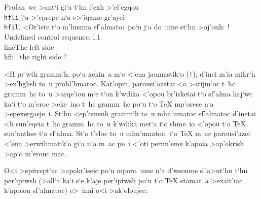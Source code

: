 Profan~wc >ant`i gi`a t`hn l'exh >'el'egqou {\tt \\hfli} j`a >'eprepe n`a
e>'iqame gr'ayei {\tt \\hfil}.  <Or'iste t`o m'hnuma sf'almatoc po`u j`a
do~ume st`hn >oj'onh:
\beginuser
\obeyspaces
! Undefined control sequence.
l.1 \\line\lb The left side \\hfli
\                               the right side\rb
?
\enduser

<H pr'wth gramm'h, po`u xekin~a m`e <'ena jaumastik`o ({\tt !}),
d'inei m'ia mikr`h >ex'hghsh to~u probl'hmatoc.  Kat'opin,
parousi'azetai <o >arijm`oc t~hc gramm~hc to~u >arqe'iou m`e t`on
k'wdika <'opou br'isketai t`o sf'alma kaj`wc ka`i t`o m'eroc >eke~ino
t~hc gramm~hc po`u t`o {\rm \TeX} mp'orese n`a >epexergasje~i.  St`hn
<ep'omenh gramm`h to~u mhn'umatoc sf'almatoc d'inetai <h sun'eqeia t~hc
gramm~hc to~u k'wdika met`a t`o shme~io <'opou t`o {\rm \TeX} sun'anthse
t`o sf'alma.  St`o t'eloc to~u mhn'umatoc, t`o {\rm \TeX} m~ac
parousi'azei <'ena >erwthmatik`o gi`a n`a m~ac pe~i <'oti perim'enei
k'apoia >ap'okrish >ap`o m'erouc mac.

O<i >epitrept`ec >apokr'iseic po`u mporo~ume n`a d'wsoume
s''\NB{}a>ut`hn t`hn per'iptwsh (>all`a ka`i s`e k'aje per'iptwsh po`u
t`o {\rm \TeX} stamat~a >exait'iac k'apoiou sf'almatoc) e>~inai
o<i >ak'oloujec:


